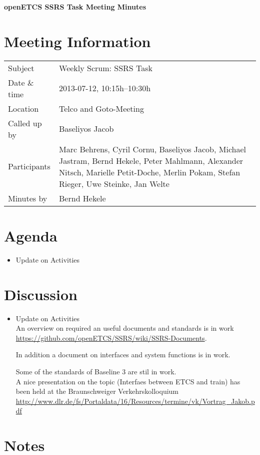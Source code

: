 \documentclass[a4paper, 11pt]{article}
\begin{document}
{\begin{center}\huge\bf openETCS SSRS Task Meeting Minutes\end{center}}
\section{Meeting Information}

\renewcommand{\arraystretch}{1.5}
\begin{supertabular}{m{.2\textwidth}m{.8\textwidth}}
Subject &  Weekly Scrum: SSRS Task\\
Date \& time & 2013-07-12, 10:15h--10:30h\\
Location & Telco and Goto-Meeting\\
Called up by & Baseliyos Jacob\\
Participants &
Marc Behrens,
Cyril Cornu,
Baseliyos Jacob,
Michael Jastram,
Bernd Hekele,
Peter Mahlmann,
Alexander Nitsch,
Marielle Petit-Doche,
Merlin Pokam,
Stefan Rieger,
Uwe Steinke,
Jan Welte
\\

Minutes by & Bernd Hekele\\

\end{supertabular}
\renewcommand{\arraystretch}{1.0}


\section{{Agenda}}
\begin{itemize}
\item Update on Activities\\
\end{itemize}

\section{Discussion}
\begin{itemize}
\item Update on Activities\\
An overview on required an useful documents and standards is in work\\
\url{https://github.com/openETCS/SSRS/wiki/SSRS-Documents}. 

In addition a document on interfaces  and system functions is in work.

Some of the standards of Baseline 3 are stil in work.\\
A nice presentation on the topic (Interfaes between ETCS and train) has been held at the Braunschweiger Verkehrskolloquium\\
\url{http://www.dlr.de/fs/Portaldata/16/Resources/termine/vk/Vortrag_Jakob.pdf}

\end{itemize}


\section{Notes}
\end{document}
